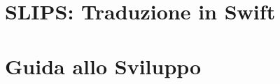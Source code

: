 \documentclass[12pt,a4paper,twoside,openright]{book}
\theoremstyle{definition}
\theoremstyle{remark}
\begin{document}
\part{SLIPS: Traduzione in Swift}









\part{Guida allo Sviluppo}







\appendix





\backmatter
\printbibliography[heading=bibintoc]
\printindex
\end{document}

